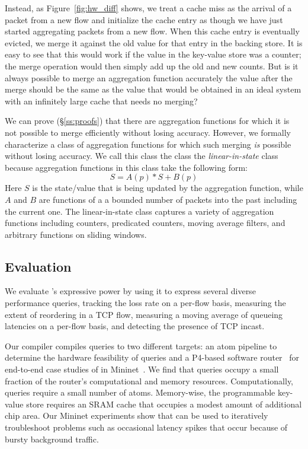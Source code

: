 Instead, as Figure~\ref{fig:hw_diff} shows, we treat a cache miss as the
arrival of a packet from a new flow and initialize the cache entry as though we
have just started aggregating packets from a new flow. When this cache entry is
eventually evicted, we merge it against the old value for that entry in the
backing store. It is easy to see that this would work if the value in the
key-value store was a counter; the merge operation would then simply add up the
old and new counts.  But is it always possible to merge an aggregation function
accurately \ie the value after the merge should be the same as the value that
would be obtained in an ideal system with an infinitely large cache that needs
no merging?

We can prove (\S\ref{ss:proofs}) that there are aggregation functions for which
it is not possible to merge efficiently without losing accuracy. However, we
formally characterize a class of aggregation functions for which such merging
{\em is} possible without losing accuracy. We call this class the class the
{\em linear-in-state} class because aggregation functions in this class take
the following form:
\begin{equation}
S = A(p) * S + B(p)
\end{equation}
Here $S$ is the state/value that is being updated by the aggregation function,
while $A$ and $B$ are functions of a a bounded number of packets into the past
including the current one. The linear-in-state class captures a variety of
aggregation functions including counters, predicated counters, moving average
filters, and arbitrary functions on sliding windows.

\subsection{Evaluation} We evaluate \TheSystem's expressive power by using it
to express several diverse performance queries, \eg tracking the loss rate on a
per-flow basis, measuring the extent of reordering in a TCP flow, measuring a
moving average of queueing latencies on a per-flow basis, and detecting the
presence of TCP incast.

Our \TheSystem compiler compiles queries to two different targets: an atom
pipeline to determine the hardware feasibility of \TheSystem queries and a
P4-based software router~\cite{p4-bmv2} for end-to-end case studies of
\TheSystem in Mininet~\cite{mininet}. We find that \TheSystem queries occupy a
small fraction of the router's computational and memory resources.
Computationally, queries require a small number of atoms. Memory-wise, the
programmable key-value store requires an SRAM cache that occupies a modest
amount of additional chip area. Our Mininet experiments show that \TheSystem
can be used to iteratively troubleshoot problems such as occasional latency
spikes that occur because of bursty background traffic.

